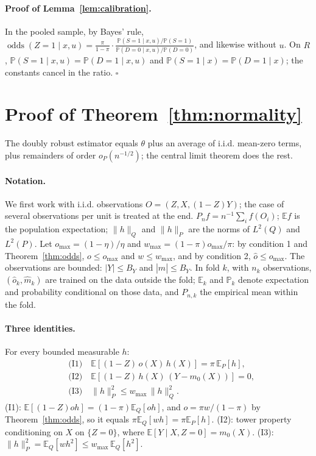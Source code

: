 \documentclass[twoside,11pt]{article}
\newcommand{\E}{\mathbb{E}}
\newcommand{\PP}{\mathbb{P}}
\newcommand{\odds}{\operatorname{odds}}
\theoremstyle{plain}
\theoremstyle{definition}
\begin{document}
\paragraph{Proof of Lemma~\ref{lem:calibration}.}
In the pooled sample, by Bayes' rule, $\odds(Z=1\mid x,u)=\frac{\pi}{1-\pi}\cdot\frac{\PP(S=1\mid x,u)/\PP(S=1)}{\PP(D=0\mid x,u)/\PP(D=0)}$, and likewise without $u$. On $R$, $\PP(S=1\mid x,u)=\PP(D=1\mid x,u)$ and $\PP(S=1\mid x)=\PP(D=1\mid x)$; the constants cancel in the ratio.
\hfill$\square$


\section{Proof of Theorem~\ref{thm:normality}}\label{app:proof}

The doubly robust estimator equals $\theta$ plus an average of i.i.d. mean-zero terms, plus remainders of order $o_P(n^{-1/2})$; the central limit theorem does the rest.

\paragraph{Notation.} We first work with i.i.d. observations $O=(Z,X,(1-Z)Y)$; the case of several observations per unit is treated at the end. $P_nf=n^{-1}\sum_if(O_i)$; $\E f$ is the population expectation; $\|h\|_Q$ and $\|h\|_P$ are the norms of $L^2(Q)$ and $L^2(P)$. Let $o_{\max}=(1-\eta)/\eta$ and $w_{\max}=(1-\pi)o_{\max}/\pi$: by condition 1 and Theorem~\ref{thm:odds}, $o\le o_{\max}$ and $w\le w_{\max}$, and by condition 2, $\hat o\le o_{\max}$. The observations are bounded: $|Y|\le B_Y$ and $|\hat m|\le B_Y$. In fold $k$, with $n_k$ observations, $(\hat o_k,\hat m_k)$ are trained on the data outside the fold; $\E_k$ and $\PP_k$ denote expectation and probability conditional on those data, and $P_{n,k}$ the empirical mean within the fold.

\paragraph{Three identities.} For every bounded measurable $h$:
\begin{align*}
&\text{(I1)}\quad \E[(1-Z)\,o(X)\,h(X)]=\pi\,\E_P[h],\\
&\text{(I2)}\quad \E[(1-Z)\,h(X)\,(Y-m_0(X))]=0,\\
&\text{(I3)}\quad \|h\|_P^2\le w_{\max}\,\|h\|_Q^2 .
\end{align*}
(I1): $\E[(1-Z)oh]=(1-\pi)\E_Q[oh]$, and $o=\pi w/(1-\pi)$ by Theorem~\ref{thm:odds}, so it equals $\pi\E_Q[wh]=\pi\E_P[h]$. (I2): tower property conditioning on $X$ on $\{Z=0\}$, where $\E[Y\mid X,Z=0]=m_0(X)$. (I3): $\|h\|_P^2=\E_Q[wh^2]\le w_{\max}\,\E_Q[h^2]$.
\end{document}
